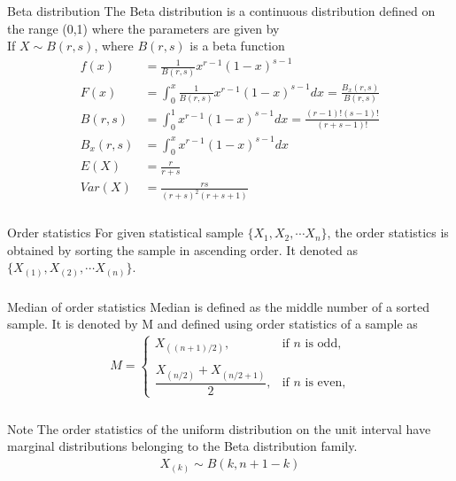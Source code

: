 \documentclass{beamer}
\begin{document}
\begin{frame}
\frametitle{}
\begin{block}{Beta distribution}
The Beta distribution is a continuous distribution defined on the range
(0,1) where the parameters are given by\\
If $X\sim B(r,s)$, where $B(r,s)$ is a beta function
\begin{align}
  \label{eq:4}  f(x)&=\frac{1}{B(r,s)}x^{r-1}(1-x)^{s-1}\\ 
    \label{eq:5}F(x)&=\int_{0}^{x}\frac{1}{B(r,s)}x^{r-1}(1-x)^{s-1}dx=\frac{B_x(r,s)}{B(r,s)}\\ 
  \label{eq:6}  B(r,s)&=\int_{0}^{1}x^{r-1}(1-x)^{s-1}dx=\frac{(r-1)!(s-1)!}{(r+s-1)!}\\ 
     \label{eq:7}B_x(r,s)&=\int_{0}^{x}x^{r-1}(1-x)^{s-1}dx\\
   \label{eq:8} E(X)&=\frac{r}{r+s}\\ 
    \label{var} Var(X)&=\frac{rs}{(r+s)^{2}(r+s+1)} 
\end{align}
\end{block}
\end{frame}

\begin{frame}
\frametitle{}
\begin{block}{Order statistics}
For given statistical sample $\{X_1, X_2,\cdots X_n\}$, the order statistics is obtained by sorting the sample in ascending order. It denoted as $\{X_{(1)}, X_{(2)},\cdots X_{(n)}\}$.
\end{block}

\frametitle{}
\begin{block}{Median of order statistics}
Median is defined as the middle number of a sorted sample. It is denoted by M and defined using order statistics of a sample as
\begin{align}
  M =
  \begin{cases}
   X_{((n+1)/2)},                                           &\text{if $n$ is odd,} \\ \\
  \dfrac{ X_{(n/2)} + X_{(n/2+1)}}{2} ,                     &\text{if $n$ is even,} 
  \end{cases}
\end{align}
\label{median}\label{def2}
\end{block}
\end{frame}

\begin{frame}
\frametitle{}
\begin{block}{Note}
The order statistics of the uniform distribution on the unit interval have marginal distributions belonging to the Beta distribution family.
\begin{align}
X_{(k)} \sim B(k,n+1-k)
\end{align}\label{rem}
\end{block}
\end{frame}
\end{document}
